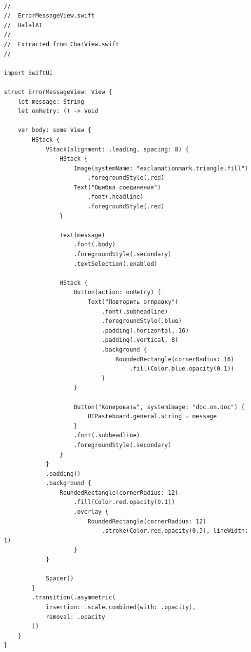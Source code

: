 \begin{lstlisting}[basicstyle=\tiny\ttfamily,breaklines=true]

//
//  ErrorMessageView.swift
//  HalalAI
//
//  Extracted from ChatView.swift
//

import SwiftUI

struct ErrorMessageView: View {
    let message: String
    let onRetry: () -> Void

    var body: some View {
        HStack {
            VStack(alignment: .leading, spacing: 8) {
                HStack {
                    Image(systemName: "exclamationmark.triangle.fill")
                        .foregroundStyle(.red)
                    Text("Ошибка соединения")
                        .font(.headline)
                        .foregroundStyle(.red)
                }

                Text(message)
                    .font(.body)
                    .foregroundStyle(.secondary)
                    .textSelection(.enabled)

                HStack {
                    Button(action: onRetry) {
                        Text("Повторить отправку")
                            .font(.subheadline)
                            .foregroundStyle(.blue)
                            .padding(.horizontal, 16)
                            .padding(.vertical, 8)
                            .background {
                                RoundedRectangle(cornerRadius: 16)
                                    .fill(Color.blue.opacity(0.1))
                            }
                    }

                    Button("Копировать", systemImage: "doc.on.doc") {
                        UIPasteboard.general.string = message
                    }
                    .font(.subheadline)
                    .foregroundStyle(.secondary)
                }
            }
            .padding()
            .background {
                RoundedRectangle(cornerRadius: 12)
                    .fill(Color.red.opacity(0.1))
                    .overlay {
                        RoundedRectangle(cornerRadius: 12)
                            .stroke(Color.red.opacity(0.3), lineWidth: 1)
                    }
            }

            Spacer()
        }
        .transition(.asymmetric(
            insertion: .scale.combined(with: .opacity),
            removal: .opacity
        ))
    }
}
\end{lstlisting}

